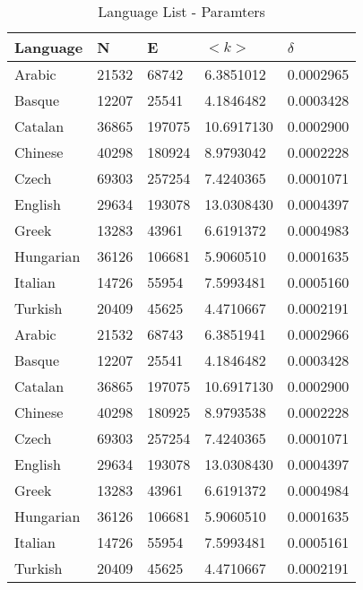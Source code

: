 \documentclass[12pt, a4paper]{article}
\begin{document}
\begin{table}[H]
    \centering
    \begin{tabular}{l l l l l}
    Language & N & E & $<k>$ & $\delta$ \\
     \hline
     Arabic    &   21532 & 68742 & 6.3851012 & 0.0002965 \\ 
     Basque    & 12207 & 25541 & 4.1846482 & 0.0003428  \\
     Catalan   & 36865 & 197075 & 10.6917130 & 0.0002900 \\ 
     Chinese   & 40298 & 180924 & 8.9793042 & 0.0002228  \\
     Czech     & 69303 & 257254 & 7.4240365 & 0.0001071  \\
     English   & 29634 & 193078 & 13.0308430 & 0.0004397 \\ 
     Greek     & 13283 & 43961 & 6.6191372 & 0.0004983  \\
     Hungarian & 36126 & 106681 & 5.9060510 & 0.0001635  \\
     Italian   & 14726 & 55954 & 7.5993481 & 0.0005160  \\
     Turkish   & 20409 & 45625 & 4.4710667 & 0.0002191  \\

    Arabic & 21532 & 68743 & 6.3851941 & 0.0002966 \\
    Basque & 12207 & 25541 & 4.1846482 & 0.0003428 \\
    Catalan & 36865 & 197075 & 10.6917130 & 0.0002900 \\
    Chinese & 40298 & 180925 & 8.9793538 & 0.0002228 \\
    Czech & 69303 & 257254 & 7.4240365 & 0.0001071 \\
    English & 29634 & 193078 & 13.0308430 & 0.0004397 \\
    Greek & 13283 & 43961 & 6.6191372 & 0.0004984 \\
    Hungarian & 36126 & 106681 & 5.9060510 & 0.0001635 \\
    Italian & 14726 & 55954 & 7.5993481 & 0.0005161 \\
    Turkish & 20409 & 45625 & 4.4710667 & 0.0002191 \\
    \end{tabular}
   \caption{Language List - Paramters}
   \label{table:1}
\end{table}
\end{document}
